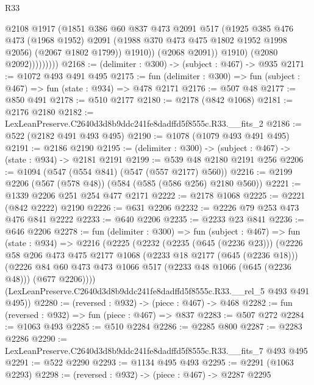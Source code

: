 \begin{lexlean}{R33}
\begin{coremodule}
                          @2108
                          @1917
                          (@1851
                            @386
                            @60
                            @837
                            @473
                            @2091
                            @517
                            (@1925
                              @385
                              @476
                              @473
                              (@1968 @1952)
                              @2091
                              (@1988 @370 @473 @475 @1802 @1952 @1998 @2056)
                              (@2067 @1802 @1799))
                            @1910))
                        (@2068 @2091))
                      @1910)
                    (@2080 @2092)))))))))
@2168 := (delimiter : @300) -> (subject : @467) -> @935
@2171 := @1072 @493 @491 @495
@2175 := fun (delimiter : @300) => fun (subject : @467) => fun (state : @934) => @478 @2171
@2176 := @507 @48
@2177 := @850 @491
@2178 := @510 @2177
@2180 := @2178 (@842 @1068)
@2181 := @2176 @2180
@2182 := LexLeanPreserve.C2640d3d8b9ddc241fe8dadffd5f8555c.R33.__fits_2
@2186 := @522 (@2182 @491 @493 @495)
@2190 := @1078 (@1079 @493 @491 @495)
@2191 := @2186 @2190
@2195 := (delimiter : @300) -> (subject : @467) -> (state : @934) -> @2181 @2191
@2199 := @539 @48 @2180 @2191 @256
@2206 := @1094 (@547 (@554 @841) (@547 (@557 @2177) @560))
@2216 := @2199 @2206 (@567 (@578 @48)) (@584 (@585 (@586 @256) @2180 @560))
@2221 := @1339 @2206 @251 @254 @477 @2171
@2222 := @2178 @1068
@2225 := @2221 (@842 @2222) @2190
@2226 := @631 @2206
@2232 := @2226 @79 @253 @473 @476 @841 @2222
@2233 := @640 @2206
@2235 := @2233 @23 @841
@2236 := @646 @2206
@2278 := fun (delimiter : @300) =>
  fun (subject : @467) =>
  fun (state : @934) =>
  @2216
    (@2225
      (@2232
        (@2235 (@645 (@2236 @23)))
        (@2226
          @58
          @206
          @473
          @475
          @2177
          @1068
          (@2233 @18 @2177 (@645 (@2236 @18)))
          (@2226 @84 @60 @473 @473 @1066 @517 (@2233 @48 @1066 (@645 (@2236 @48))) (@677 @2206))))
      (LexLeanPreserve.C2640d3d8b9ddc241fe8dadffd5f8555c.R33.__rel_5 @493 @491 @495))
@2280 := (reversed : @932) -> (piece : @467) -> @468
@2282 := fun (reversed : @932) => fun (piece : @467) => @837
@2283 := @507 @272
@2284 := @1063 @493
@2285 := @510 @2284
@2286 := @2285 @800
@2287 := @2283 @2286
@2290 := LexLeanPreserve.C2640d3d8b9ddc241fe8dadffd5f8555c.R33.__fits_7 @493 @495
@2291 := @522 @2290
@2293 := @1134 @495 @493
@2295 := @2291 (@1063 @2293)
@2298 := (reversed : @932) -> (piece : @467) -> @2287 @2295

\end{coremodule}
\end{lexlean}
